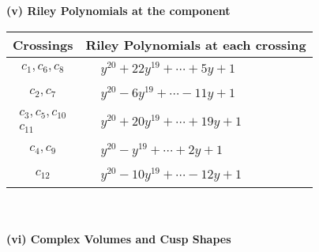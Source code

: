 \documentclass[1p]{elsarticle_modified}
\theoremstyle{definition}
\begin{document}
\newpage\renewcommand{\arraystretch}{1}
\flushleft \textbf{(v) Riley Polynomials at the component}\newline \\
\begin{tabular}{m{50pt}|m{274pt}}
Crossings & \hspace{64pt}Riley Polynomials at each crossing \\
\hline $$\begin{aligned}c_{1},c_{6},c_{8}\end{aligned}$$&$\begin{aligned}
&y^{20}+22 y^{19}+\cdots+5 y+1
\end{aligned}$\\
\hline $$\begin{aligned}c_{2},c_{7}\end{aligned}$$&$\begin{aligned}
&y^{20}-6 y^{19}+\cdots-11 y+1
\end{aligned}$\\
\hline $$\begin{aligned}c_{3},c_{5},c_{10}\\c_{11}\end{aligned}$$&$\begin{aligned}
&y^{20}+20 y^{19}+\cdots+19 y+1
\end{aligned}$\\
\hline $$\begin{aligned}c_{4},c_{9}\end{aligned}$$&$\begin{aligned}
&y^{20}- y^{19}+\cdots+2 y+1
\end{aligned}$\\
\hline $$\begin{aligned}c_{12}\end{aligned}$$&$\begin{aligned}
&y^{20}-10 y^{19}+\cdots-12 y+1
\end{aligned}$\\
\hline
\end{tabular}\\~\\
\newpage\flushleft \textbf{(vi) Complex Volumes and Cusp Shapes}
\end{document}
